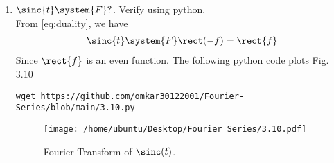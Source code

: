\documentclass[journal,12pt,twocolumn]{IEEEtran}
\renewcommand\thesection{\arabic{section}}
\begin{document}
\begin{enumerate}[label=\thesection.\arabic*
,ref=\thesection.\theenumi]
\begin{align}
	&=\frac{e^{\j\pi f} - e^{-\j\pi f}}{\j2\pi f} = \frac{\sin{\pi f}}{\pi f} = \sinc{f}
	\label{eq:fourier-rect}
\end{align}
The  following python code plots Fig. 3.9
\begin{lstlisting}
wget https://github.com/omkar30122001/Fourier-Series/blob/main/3.9.py
\end{lstlisting}
\begin{figure}[!ht]
	\texttt{[image: /home/ubuntu/Desktop/Fourier Series/3.9.pdf]}
	\caption{Fourier Transform of $\rect{t}$.}
	\label{fig:fourier-rect}
\end{figure}
\item 
$	 \sinc{t}\system{F} ?$.  Verify using python. \\
\solution
From \eqref{eq:duality}, we have 
\begin{align}
	\sinc{t}\system{F}\rect(-f)=\rect{f}
	\label{eq:fourier-sinc}
\end{align}
Since $\rect{f}$ is an even function.
The following python code plots Fig. 3.10
\begin{lstlisting}
wget https://github.com/omkar30122001/Fourier-Series/blob/main/3.10.py
\end{lstlisting}
\begin{figure}[!ht]
	\texttt{[image: /home/ubuntu/Desktop/Fourier Series/3.10.pdf]}
	\caption{Fourier Transform of $\sinc(t)$.}
	\label{fig:fourier-sinc}
\end{figure}
\end{enumerate}
\end{document}
